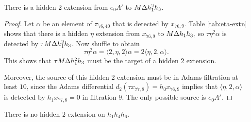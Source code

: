 \begin{lemma}
\label{lem:2-e0A'}
There is a hidden $2$ extension from $e_0 A'$ to $M \Delta h_1^2 h_3$.
\end{lemma}

\begin{proof}
Let $\alpha$ be an element of $\pi_{76,40}$ that is detected
by $x_{76,9}$.
Table \ref{tab:eta-extn} shows that there is a hidden
$\eta$ extension from $x_{76,9}$ to $M \Delta h_1 h_3$,
so $\tau \eta^2 \alpha$ is detected by $\tau M \Delta h_1^2 h_3$.
Now shuffle to obtain
\[
\tau \eta^2 \alpha = \langle 2, \eta, 2 \rangle \alpha =
2 \langle \eta, 2, \alpha \rangle.
\]
This shows that $\tau M \Delta h_1^2 h_3$ must be the target
of a hidden $2$ extension.

Moreover, the source of this hidden $2$ extension must be in Adams
filtration at least $10$, since the Adams differential
$d_2(\tau x_{77,8}) = h_0 x_{76,9}$ implies that
$\langle \eta, 2, \alpha \rangle$ is detected by
$h_1 x_{77,8} = 0$ in filtration $9$.
The only possible source is $e_0 A'$.
\end{proof}

\begin{lemma}
\label{lem:2-h1h4h6}
There is no hidden $2$ extension on $h_1 h_4 h_6$.
\end{lemma}

